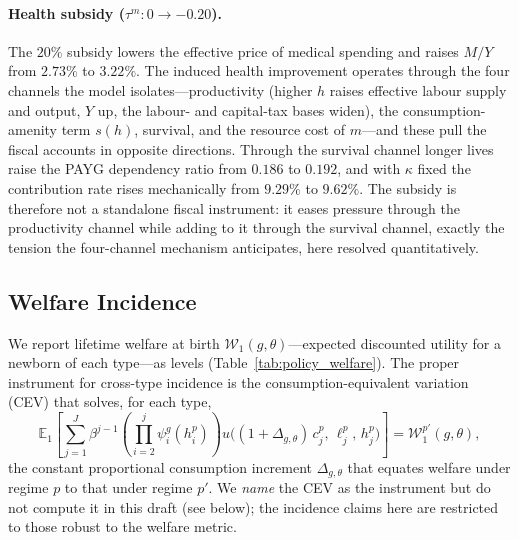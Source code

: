 \documentclass[12pt,a4paper]{article}
\begin{document}
\paragraph{Health subsidy ($\tau^m: 0\to-0.20$).} The $20\%$ subsidy lowers the effective price of medical spending and raises $M/Y$ from $2.73\%$ to $3.22\%$. The induced health improvement operates through the four channels the model isolates---productivity (higher $h$ raises effective labour supply and output, $Y$ up, the labour- and capital-tax bases widen), the consumption-amenity term $s(h)$, survival, and the resource cost of $m$---and these pull the fiscal accounts in opposite directions. Through the survival channel longer lives raise the PAYG dependency ratio from $0.186$ to $0.192$, and with $\kappa$ fixed the contribution rate rises mechanically from $9.29\%$ to $9.62\%$. The subsidy is therefore not a standalone fiscal instrument: it eases pressure through the productivity channel while adding to it through the survival channel, exactly the tension the four-channel mechanism anticipates, here resolved quantitatively.

\subsection{Welfare Incidence}
\label{subsec:welfare_incidence}

We report lifetime welfare at birth $\mathcal{W}_1(g,\theta)$---expected discounted utility for a newborn of each type---as levels (Table~\ref{tab:policy_welfare}). The proper instrument for cross-type incidence is the consumption-equivalent variation (CEV) that solves, for each type,
\begin{equation}
\label{eq:cev_newborn}
\mathbb{E}_1\!\left[\sum_{j=1}^{J} \beta^{j-1}\!\left(\prod_{i=2}^{j}\psi_i^g(h_i^p)\right) u\bigl((1+\Delta_{g,\theta})\,c_j^p,\,\ell_j^p,\,h_j^p\bigr)\right] = \mathcal{W}^{p'}_1(g,\theta),
\end{equation}
the constant proportional consumption increment $\Delta_{g,\theta}$ that equates welfare under regime $p$ to that under regime $p'$. We \emph{name} the CEV as the instrument but do not compute it in this draft (see below); the incidence claims here are restricted to those robust to the welfare metric.
\end{document}
